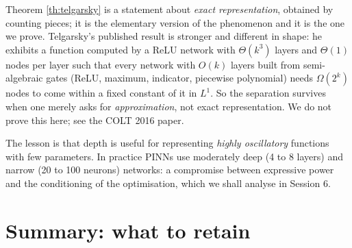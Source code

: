 \documentclass[11pt,a4paper]{article}
\begin{document}
\begin{remark}\label{rem:telgarsky-real}
Theorem \ref{th:telgarsky} is a statement about \emph{exact representation}, obtained by counting
pieces; it is the elementary version of the phenomenon and it is the one we prove. Telgarsky's
published result is stronger and different in shape: he exhibits a function computed by a ReLU
network with $\Theta(k^3)$ layers and $\Theta(1)$ nodes per layer such that every network with
$O(k)$ layers built from semi-algebraic gates (ReLU, maximum, indicator, piecewise polynomial)
needs $\Omega(2^k)$ nodes to come within a fixed constant of it in $L^1$. So the separation survives
when one merely asks for \emph{approximation}, not exact representation. We do not prove this here;
see the COLT 2016 paper.
\end{remark}

\begin{remark}
The lesson is that depth is useful for representing \emph{highly oscillatory} functions with few
parameters. In practice PINNs use moderately deep (4 to 8 layers) and narrow (20 to 100 neurons)
networks: a compromise between expressive power and the conditioning of the optimisation, which we
shall analyse in Session 6.
\end{remark}

\section{Summary: what to retain}
\end{document}

